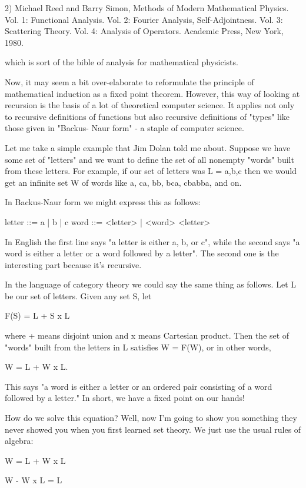 2) Michael Reed and Barry Simon, Methods of Modern Mathematical Physics.
Vol. 1: Functional Analysis.  Vol. 2: Fourier Analysis, Self-Adjointness.
Vol. 3: Scattering Theory.  Vol. 4: Analysis of Operators.  Academic
Press, New York, 1980.

which is sort of the bible of analysis for mathematical physicists.

Now, it may seem a bit over-elaborate to reformulate the principle of
mathematical induction as a fixed point theorem.  However, this way of
looking at recursion is the basis of a lot of theoretical computer
science.   It applies not only to recursive definitions of functions
but also recursive definitions of "types" like those given in "Backus-
Naur form" - a staple of computer science.

Let me take a simple example that Jim Dolan told me about.  Suppose we
have some set of "letters" and we want to define the set of all nonempty
"words" built from these letters.  For example, if our set of letters
was L = {a,b,c} then we would get an infinite set W of words like a, ca,
bb, bca, cbabba, and on.

In Backus-Naur form we might express this as follows:

letter ::= a | b | c
word ::= <letter> | <word> <letter>

In English the first line says "a letter is either a, b, or c", while
the second says "a word is either a letter or a word followed by a
letter".  The second one is the interesting part because it's recursive.

In the language of category theory we could say the same thing as
follows.  Let L be our set of letters.  Given any set S, let

F(S) = L + S x L

where + means disjoint union and x means Cartesian product.  Then the
set of "words" built from the letters in L satisfies W = F(W), or in
other words,

W = L + W x L.

This says "a word is either a letter or an ordered pair consisting of a 
word followed by a letter."  In short, we have a fixed point on our
hands!

How do we solve this equation?  Well, now I'm going to show you
something they never showed you when you first learned set theory.  We
just use the usual rules of algebra:

W = L + W x L 

W - W x L = L

